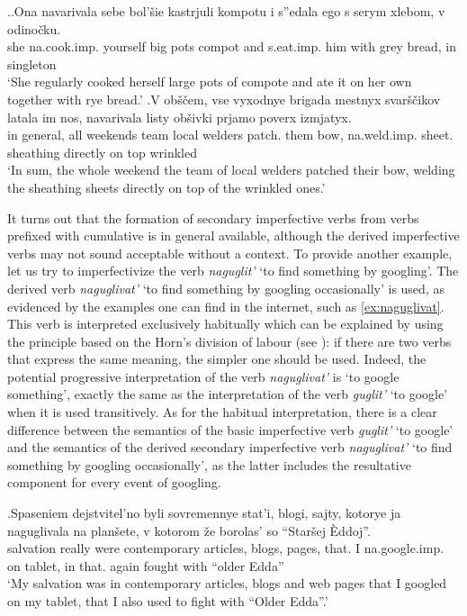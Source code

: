 \ex.\ag.\label{ex:navarivat2}Ona navarivala sebe bol'\v{s}ie kastrjuli kompotu i s''edala ego s serym xlebom, v odino\v{c}ku.\\
she na.cook.imp. yourself big pots compot and s.eat.imp. him with grey bread, in singleton\\
\trans `She regularly cooked herself large pots of compote and ate it on her own together with rye bread.'
\bg.\label{ex:navarivat1}V ob\v{s}\v{c}em, vse vyxodnye brigada mestnyx svar\v{s}\v{c}ikov latala im nos, navarivala listy ob\v{s}ivki prjamo poverx izmjatyx.\\
in general, all weekends team local welders patch. them bow, na.weld.imp. sheet. sheathing directly {on top} wrinkled\\
\trans `In sum, the whole weekend the team of local welders patched their bow, welding the sheathing sheets directly on top of the wrinkled ones.'

It turns out that the formation of secondary imperfective verbs from verbs prefixed with cumulative  is in general available, although the derived imperfective verbs may not sound acceptable without a context. To provide another example, let us try to imperfectivize the verb \textit{naguglit'} `to find something by googling'. The derived verb \textit{naguglivat'} `to find something by googling occasionally' is used, as evidenced by the examples one can find in the internet, such as \ref{ex:naguglivat}. This verb is interpreted exclusively habitually which can be explained by using the principle based on the Horn's division of labour (see \citealt{Horn:84}): if there are two verbs that express the same meaning, the simpler one should be used. Indeed, the potential progressive interpretation of the verb \textit{naguglivat'} is `to google something', exactly the same as the interpretation of the verb \textit{guglit'} `to google' when it is used transitively. As for the habitual interpretation, there is a clear difference between the semantics of the basic imperfective verb \textit{guglit'} `to google' and the semantics of the derived secondary imperfective verb \textit{naguglivat'} `to find something by googling occasionally', as the latter includes the resultative component for every event of googling. 

\exg.\label{ex:naguglivat}Spaseniem dejstvitel'no byli sovremennye stat'i, blogi, sajty, kotorye ja naguglivala na plan\v{s}ete, v kotorom \v{z}e borolas' so ``Star\v{s}ej \`{E}ddoj''.\\
salvation really were contemporary articles, blogs, pages, that. I na.google.imp. on tablet, in that. again fought with ``older Edda''\\
\trans `My salvation was in contemporary articles, blogs and web pages that I googled on my tablet, that I also used to fight with ``Older Edda''.'\\

